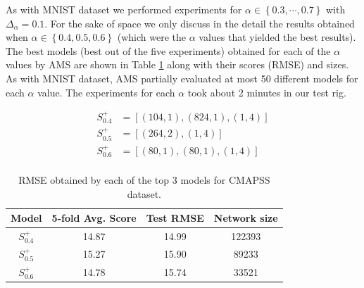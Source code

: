 \documentclass[journal]{IEEEtran}
\begin{document}
As with MNIST dataset we performed experiments for $\alpha \in \left\lbrace 0.3, \cdots, 0.7 \right\rbrace$ with $\Delta_\alpha = 0.1$. For the sake of space we only discuss in the detail the results obtained when $\alpha \in \left\lbrace 0.4, 0.5, 0.6 \right\rbrace$ (which were the $\alpha$ values that yielded the best results). The best models (best out of the five experiments) obtained for each of the $\alpha$ values by AMS are shown in Table \ref{table:avg_rmse_cmapss} along with their scores (RMSE) and sizes. As with MNIST dataset, AMS partially evaluated at most 50 different models for each $\alpha$ value. The experiments for each $\alpha$ took about 2 minutes in our test rig.

\begin{align*}
S^+_{0.4} & = \left[ (104, 1), (824, 1), (1, 4) \right] \\
S^+_{0.5} & = \left[ (264, 2), (1, 4) \right] \\
S^+_{0.6} & = \left[ (80, 1), (80, 1), (1, 4) \right] \\
\end{align*}

\begin{table}[!htb]
\begin{center}
\begin{tabular}{| c | c | c | c |}
\hline
Model & 5-fold Avg. Score & Test RMSE & Network size\\
\hline
$S^+_{0.4}$ & 14.87 & 14.99 & 122393\\
$S^+_{0.5}$ & 15.27 & 15.90 & 89233\\
$S^+_{0.6}$ & 14.78 & 15.74 & 33521\\
\hline
\end{tabular}
\end{center}
\caption{RMSE obtained by each of the top 3 models for CMAPSS dataset.}
\label{table:avg_rmse_cmapss}
\end{table}

\end{document}
